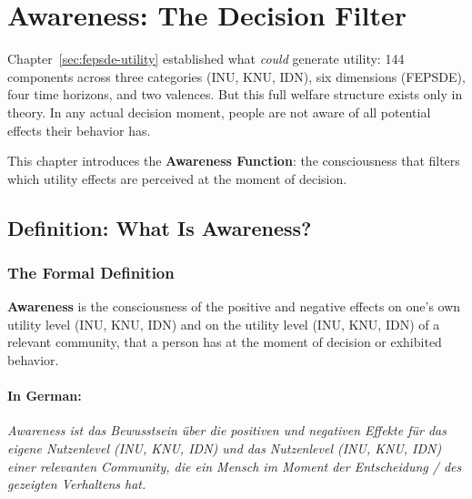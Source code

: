 \section{Awareness: The Decision Filter}
\label{sec:awareness}


Chapter~\ref{sec:fepsde-utility} established what \emph{could} generate utility:
144 components across three categories (INU, KNU, IDN), six dimensions (FEPSDE),
four time horizons, and two valences. But this full welfare structure exists
only in theory. In any actual decision moment, people are not aware of all
potential effects their behavior has.

This chapter introduces the \textbf{Awareness Function}: the consciousness
that filters which utility effects are perceived at the moment of decision.

\subsection{Definition: What Is Awareness?}
\label{subsec:awareness-definition}

\subsubsection{The Formal Definition}

\begin{definition}[Awareness]
\label{def:awareness}
\textbf{Awareness} is the consciousness of the positive and negative effects 
on one's own utility level (INU, KNU, IDN) and on the utility level (INU, KNU, IDN) 
of a relevant community, that a person has at the moment of decision or 
exhibited behavior.
\end{definition}

\paragraph{In German:}
\textit{Awareness ist das Bewusstsein über die positiven und negativen Effekte 
für das eigene Nutzenlevel (INU, KNU, IDN) und das Nutzenlevel (INU, KNU, IDN) 
einer relevanten Community, die ein Mensch im Moment der Entscheidung / 
des gezeigten Verhaltens hat.}

